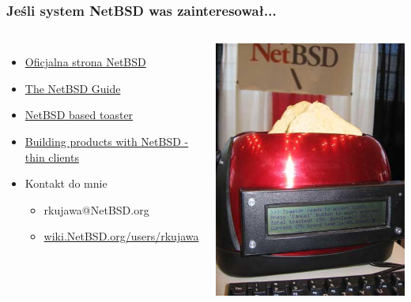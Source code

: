 \documentclass[dvipsnames,table]{beamer}
\begin{document}
\begin{frame}
\frametitle{Jeśli system NetBSD was zainteresował...}
\begin{columns}[c]
\column{3in}

\begin{itemize}
	\item \href{http://www.NetBSD.org/}{Oficjalna strona NetBSD }
	\item \href{http://www.netbsd.org/docs/guide/en/}{The NetBSD Guide}
	\item \href{http://www.embeddedarm.com/software/arm-netbsd-toaster.php}{NetBSD based toaster}
	\item \href{http://misc.allbsd.de/Vortrag/EuroBSDCon_2007/Stephen_Borrill/eurobsdcon.pdf}{Building products with NetBSD - thin clients}
	\item Kontakt do mnie
	\begin{itemize}
		\item rkujawa@NetBSD.org
		\item \href{http://wiki.NetBSD.org/users/rkujawa}{wiki.NetBSD.org/users/rkujawa}
	\end{itemize}
\end{itemize}

\column{1.5in}
	\includegraphics[scale=0.4]{img_netbsdtoaster.jpg}
\end{columns}

\end{frame}
\end{document}
